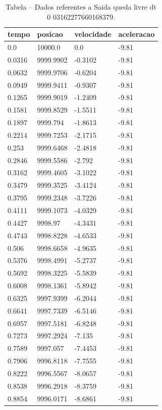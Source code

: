 \begin{table}[H]
\centering
\caption{Tabela – Dados referentes a Saida queda livre dt 0 03162277660168379.}
\label{tab:saida_queda_livre_dt_0_03162277660168379}
\begin{tabular}{llll}
\toprule
tempo & posicao & velocidade & aceleracao \\
\midrule
0.0 & 10000.0 & 0.0 & -9.81 \\
0.0316 & 9999.9902 & -0.3102 & -9.81 \\
0.0632 & 9999.9706 & -0.6204 & -9.81 \\
0.0949 & 9999.9411 & -0.9307 & -9.81 \\
0.1265 & 9999.9019 & -1.2409 & -9.81 \\
0.1581 & 9999.8529 & -1.5511 & -9.81 \\
0.1897 & 9999.794 & -1.8613 & -9.81 \\
0.2214 & 9999.7253 & -2.1715 & -9.81 \\
0.253 & 9999.6468 & -2.4818 & -9.81 \\
0.2846 & 9999.5586 & -2.792 & -9.81 \\
0.3162 & 9999.4605 & -3.1022 & -9.81 \\
0.3479 & 9999.3525 & -3.4124 & -9.81 \\
0.3795 & 9999.2348 & -3.7226 & -9.81 \\
0.4111 & 9999.1073 & -4.0329 & -9.81 \\
0.4427 & 9998.97 & -4.3431 & -9.81 \\
0.4743 & 9998.8228 & -4.6533 & -9.81 \\
0.506 & 9998.6658 & -4.9635 & -9.81 \\
0.5376 & 9998.4991 & -5.2737 & -9.81 \\
0.5692 & 9998.3225 & -5.5839 & -9.81 \\
0.6008 & 9998.1361 & -5.8942 & -9.81 \\
0.6325 & 9997.9399 & -6.2044 & -9.81 \\
0.6641 & 9997.7339 & -6.5146 & -9.81 \\
0.6957 & 9997.5181 & -6.8248 & -9.81 \\
0.7273 & 9997.2924 & -7.135 & -9.81 \\
0.7589 & 9997.057 & -7.4453 & -9.81 \\
0.7906 & 9996.8118 & -7.7555 & -9.81 \\
0.8222 & 9996.5567 & -8.0657 & -9.81 \\
0.8538 & 9996.2918 & -8.3759 & -9.81 \\
0.8854 & 9996.0171 & -8.6861 & -9.81 \\

\end{tabular}
\end{table}
